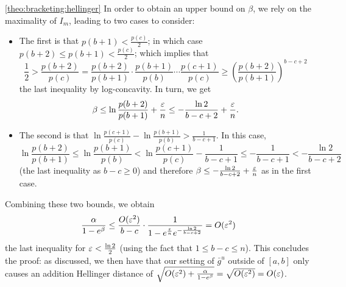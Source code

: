 \begin{proofof}{\cref{theo:bracketing:hellinger}}
\noindent In order to obtain an upper bound on $\beta$, we rely on the maximality of $I_m$, leading to two cases to consider:
\begin{itemize}
  \item The first is that $p(b+1) < \frac{p(c)}{2}$; in which case $p(b+2) \leq p(b+1) < \frac{p(c)}{2}$; which implies that
\[
    \frac{1}{2} > \frac{p(b+2)}{p(c)} = \frac{p(b+2)}{p(b+1)}\cdot\frac{p(b+1)}{p(b)}\cdots\frac{p(c+1)}{p(c)} \geq \left(\frac{p(b+2)}{p(b+1)}\right)^{b-c+2}
\]
the last inequality by log-concavity. In turn, we get
\[
    \beta \leq \ln\frac{p(b+2)}{p(b+1)} + \frac{\varepsilon}{n} \leq -\frac{\ln 2}{b-c+2}+ \frac{\varepsilon}{n}.
\]
  \item The second is that $\ln\frac{p(c+1)}{p(c)} - \ln\frac{p(b+1)}{p(b)} > \frac{1}{b-c+1}$. In this case,
  \[
      \ln \frac{p(b+2)}{p(b+1)} \leq \ln \frac{p(b+1)}{p(b)} < \ln\frac{p(c+1)}{p(c)} - \frac{1}{b-c+1} \leq - \frac{1}{b-c+1} < -\frac{\ln 2}{b-c+2}
  \]
  (the last inequality as $b-c \geq 0$) and therefore $\beta\leq -\frac{\ln 2}{b-c+2}+ \frac{\varepsilon}{n}$ as in the first case.
\end{itemize}
Combining these two bounds, we obtain
\[
    \frac{\alpha}{1-e^\beta} \leq \frac{O(\varepsilon^2)}{b-c} \cdot \frac{1}{1-e^{\frac{\varepsilon}{n}}e^{-\frac{\ln 2}{b-c+2}}} = O(\varepsilon^2)
\]
the last inequality for $\varepsilon < \frac{\ln 2}{2}$ (using the fact that $1\leq b-c\leq n$). This concludes the proof: as discussed, we then have that our setting of $\bar{g}^u$ outside of $[a,b]$ only causes an addition Hellinger distance of $\sqrt{O(\varepsilon^2)+\frac{\alpha}{1-e^\beta}} = \sqrt{O(\varepsilon^2)}=O(\varepsilon)$.

\end{proofof}

